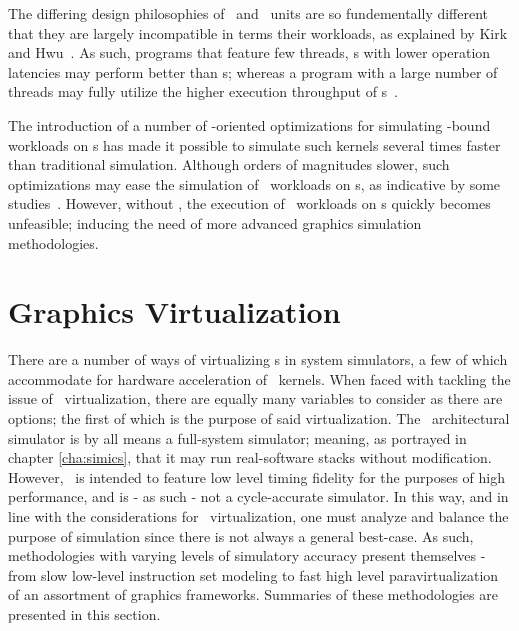 The differing design philosophies of \dvttermcpu\ and \dvttermgpu\ units are so fundementally different that they are largely incompatible in terms their workloads, as explained by Kirk and Hwu~.
As such, programs that feature few threads, \dvttermcpu s with lower operation latencies may perform better than \dvttermgpu s; whereas a program with a large number of threads may fully utilize the higher execution throughput of \dvttermgpu s~.

The introduction of a number of \dvttermcpu -oriented optimizations for simulating \dvttermgpu -bound workloads on \dvttermcpu s has made it possible to simulate such kernels several times faster than traditional simulation.
Although orders of magnitudes slower, such optimizations may ease the simulation of \dvttermgpu\ workloads on \dvttermcpu s, as indicative by some studies~.
However, without \dvttermdirectvirtualization , the execution of \dvttermgpu\ workloads on \dvttermcpu s quickly becomes unfeasible; inducing the need of more advanced graphics simulation methodologies.

\section{Graphics Virtualization}
\label{sec:backgroundandrelatedwork_graphicsvirtualization}
There are a number of ways of virtualizing \dvttermgpu s in system simulators, a few of which accommodate for hardware acceleration of \dvttermgpu\ kernels.
When faced with tackling the issue of \dvttermgpu\ virtualization, there are equally many variables to consider as there are options; the first of which is the purpose of said virtualization.
The \dvttermsimics\ architectural simulator is by all means a full-system simulator; meaning, as portrayed in chapter \ref{cha:simics}, that it may run real-software stacks without modification.
However, \dvttermsimics\ is intended to feature low level timing fidelity for the purposes of high performance, and is - as such - not a cycle-accurate simulator.
In this way, and in line with the considerations for \dvttermgpu\ virtualization, one must analyze and balance the purpose of simulation since there is not always a general best-case.
As such, methodologies with varying levels of simulatory accuracy present themselves - from slow low-level instruction set modeling to fast high level paravirtualization of an assortment of graphics frameworks.
Summaries of these methodologies are presented in this section.

